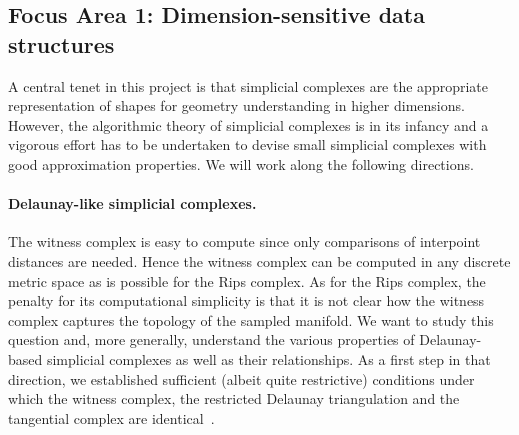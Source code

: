 \subsection*{Focus Area 1:  Dimension-sensitive data structures} 

A central tenet in this project is that simplicial complexes are the appropriate representation of shapes  for geometry understanding in higher dimensions. However,
the algorithmic theory of simplicial complexes is in its infancy and a vigorous effort has to be undertaken to devise small simplicial complexes with good approximation properties.
We will work along the following directions.



\paragraph{Delaunay-like  simplicial complexes.} 
The witness complex is easy to compute since only comparisons of interpoint distances are needed. Hence the witness complex can be computed in any discrete metric space as is possible for the Rips complex. 
As for the Rips complex, the penalty for its computational simplicity is that it is not clear how the witness complex captures the topology of the sampled manifold. 
We want to study this question and, more generally, understand the various properties of Delaunay-based simplicial complexes as well as their relationships. As a  first step in that direction, we established sufficient (albeit quite restrictive) conditions under which the witness complex, the restricted Delaunay triangulation and the tangential complex are identical~\cite{boissonnat2012stab}. 

